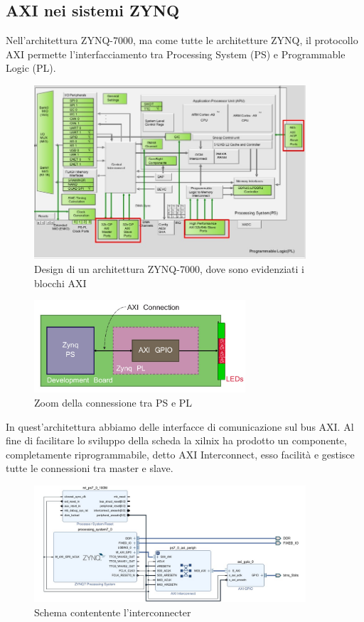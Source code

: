 \subsection{AXI nei sistemi ZYNQ}
Nell'architettura ZYNQ-7000, ma come tutte le architetture ZYNQ, il protocollo AXI permette l'interfacciamento tra Processing System (PS) e Programmable Logic (PL).\clearpage
\begin{figure}
    \centering
    \includegraphics[width=0.9\textwidth]{images/AXI3.jpg}
    \caption{Design di un architettura ZYNQ-7000, dove sono evidenziati i blocchi AXI}
    \label{fig:my_label}
\end{figure}
\begin{figure}
    \centering
    \includegraphics[width=0.7\textwidth]{images/axi.jpg}
    \caption{Zoom della connessione tra PS e PL}
    \label{fig:my_label}
\end{figure}
In quest'architettura abbiamo delle interfacce di comunicazione sul bus AXI.
Al fine di facilitare lo sviluppo della scheda la xilnix ha prodotto un componente, completamente riprogrammabile, detto AXI Interconnect, esso facilità e gestisce tutte le connessioni tra master e slave.\clearpage
\begin{figure}
    \centering
    \includegraphics[width=0.9\textwidth]{images/AXI4.jpg}
    \caption{Schema contentente l'interconnecter}
    \label{fig:my_label}
\end{figure}
